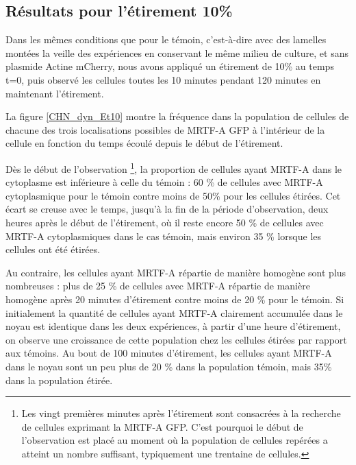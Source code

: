 \subsection{Résultats pour l'étirement 10\%}

Dans les mêmes conditions que pour le témoin, c'est-à-dire avec des lamelles montées la veille des expériences en conservant le même milieu de culture, et sans plasmide Actine mCherry, nous avons appliqué un étirement de 10\% au temps t=0, puis observé les cellules toutes les 10 minutes pendant 120 minutes en maintenant l'étirement. 

La figure \ref{CHN_dyn_Et10} montre la fréquence dans la population de cellules de chacune des trois localisations possibles de MRTF-A GFP à l'intérieur de la cellule en fonction du temps écoulé depuis le début de l'étirement. 
 
Dès le début de l'observation \footnote{Les vingt premières minutes après l'étirement sont consacrées à la recherche de cellules exprimant la MRTF-A GFP. C'est pourquoi le début de l'observation est placé au moment où la population de cellules repérées a atteint un nombre suffisant, typiquement une trentaine de cellules.}, la proportion de cellules ayant MRTF-A dans le cytoplasme est inférieure à celle du témoin : 60 \% de cellules avec MRTF-A cytoplasmique pour le témoin contre moins de 50\% pour les cellules étirées. Cet écart se creuse avec le temps, jusqu'à la fin de la période d'observation, deux heures après le début de l'étirement, où il reste encore 50 \% de cellules avec MRTF-A cytoplasmiques dans le cas témoin, mais environ 35 \% lorsque les cellules ont été étirées. 

Au contraire, les cellules ayant MRTF-A répartie de manière homogène sont plus nombreuses : plus de 25 \% de cellules avec MRTF-A répartie de manière homogène après 20 minutes d'étirement contre moins de 20  \% pour le témoin. 
Si initialement la quantité de cellules ayant MRTF-A clairement accumulée dans le noyau est identique dans les deux expériences, à partir d'une heure d'étirement, on observe une croissance de cette population chez les cellules étirées par rapport aux témoins. Au bout de 100 minutes d'étirement, les cellules ayant MRTF-A dans le noyau sont un peu plus de 20 \% dans la population témoin, mais 35\% dans la population étirée. 



